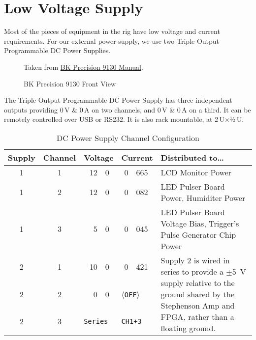 
\chapter{Low Voltage Supply}
\label{chap:eq_low_voltage}

Most of the pieces of equipment in the rig have low voltage and current requirements.  For our external power supply, we use two  Triple Output Programmable DC Power Supplies.

\begin{figure}[htbp]
  \centering
  {\tiny Taken from \href{Manuals/9130_manual.pdf}{BK Precision 9130 Manual}. \\}
  \caption{BK Precision 9130 Front View}
  \label{fig:eq_low_voltage:bkprecision9130}
\end{figure}

The  Triple Output Programmable DC Power Supply has three independent outputs  providing 0\,V \& 0\,A on two channels, and 0\,V \& 0\,A on a third.  It can be remotely controlled over USB or RS232.  It is also rack mountable, at 2\,U$\times$½\,U.

\begin{table}[htbp]
  \centering
  \begin{tabular}{@{} c c r@{.}l@{\,V\quad} r@{.}l@{\,A\quad} p{}}
    \toprule %
    {Supply} & {Channel} & \multicolumn{2}{c}{Voltage} & \multicolumn{2}{c}{Current} & Distributed to\ldots \\
    \midrule %
    1&1 & 12&0 & 0&665 & LCD Monitor Power\\
    1&2 & 12&0 & 0&082 & LED Pulser Board Power,
                         Humiditer Power\\
    1&3 &  5&0 & 0&045 & LED Pulser Board Voltage Bias,
                         Trigger's Pulse Generator Chip Power\\
    2&1 & 10&0 & 0&421 & \multirow{3}{.5\textwidth}{Supply 2 is wired in series to
    provide a $\pm$5~V supply relative to the ground shared by the Stephenson Amp and FPGA,
    rather than a floating ground.}\\
    2&2 &  0&0 & \multicolumn{2}{l}{〈\texttt{OFF}〉} 
                       & \\
    2&3 & \multicolumn{2}{l}{\texttt{Series}} & \multicolumn{2}{l}{\texttt{CH1+3}}
                       & \\
    \bottomrule %
  \end{tabular}
  \caption{DC Power Supply Channel Configuration}
  \label{tab:eq_low_voltage:external_settings}
\end{table}

